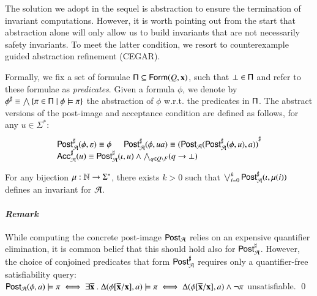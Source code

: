 \documentclass[10pt,conference,letterpaper,twocolumn]{IEEEtran}
\begin{document}
The solution we adopt in the sequel is abstraction to ensure the
termination of invariant computations. However, it is worth pointing
out from the start that abstraction alone will only allow us to build
invariants that are not necessarily safety invariants. To meet the
latter condition, we resort to counterexample guided abstraction
refinement (CEGAR).

Formally, we fix a set of formulae $\mathsf{\Pi} \subseteq
\mathsf{Form}(Q,\mathbf x)$, such that $\bot \in \mathsf{\Pi}$ and refer to these
formulae as \emph{predicates}. Given a formula $\phi$, we denote by
${\phi}^\sharp \equiv \bigwedge \left\{ \pi \in \mathsf{\Pi} \mid \phi \models
  \pi \right\}$ the abstraction of $\phi$ w.r.t. the predicates in
$\mathsf{\Pi}$. The abstract versions of the post-image and acceptance
condition are defined as follows, for any $u \in \Sigma^*$:
\[\begin{array}{l}
{\mathsf{Post}}^\sharp_{\mathcal{A}}(\phi,\varepsilon) \equiv \phi \hspace*{5mm}
{\mathsf{Post}}^\sharp_{\mathcal{A}}(\phi,ua) \equiv {(\mathsf{Post}_{\mathcal{A}}({\mathsf{Post}}^\sharp_{\mathcal{A}}(\phi,u),a))}^\sharp \\
{\mathsf{Acc}}^\sharp_{\mathcal{A}}(u) \equiv {\mathsf{Post}}^\sharp_{\mathcal{A}}(\iota,u) \wedge \bigwedge_{q \in Q \setminus F} 
(q \rightarrow \bot)
\end{array}\]
\begin{lemma}\label{lemma:abstract-invariant}
  For any bijection $\mu : {\bf \mathbb{N}} \rightarrow \Sigma^*$, there exists
  $k>0$ such that $\bigvee_{i=0}^k {\mathsf{Post}}^\sharp_{\mathcal{A}}(\iota,\mu(i))$ defines
  an invariant for $\mathcal{A}$. 
\end{lemma}

\paragraph{\em Remark}
While computing the concrete post-image $\mathsf{Post}_{\mathcal{A}}$ relies on an
expensive quantifier elimination, it is common belief that this should
hold also for ${\mathsf{Post}}^\sharp_{\mathcal{A}}$. However, the choice of conjoined
predicates that form ${\mathsf{Post}}^\sharp_{\mathcal{A}}$ requires only a quantifier-free
satisfiability query: $\mathsf{Post}_{\mathcal{A}}(\phi,a) \models \pi \iff \exists
\overline{\mathbf x} ~.~ \Delta(\phi[\overline{\mathbf x}/\mathbf x],a)
\models \pi \iff \Delta(\phi[\overline{\mathbf x}/\mathbf x],a) \wedge
\neg\pi$ unsatisfiable. \qed
\end{document}
